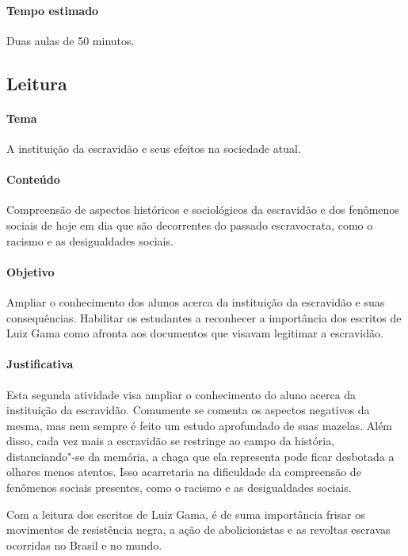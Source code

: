 \documentclass[12pt]{extarticle}
\begin{document}
\paragraph{Tempo estimado} Duas aulas de 50 minutos.

\subsection{Leitura}


\paragraph{Tema} A instituição da escravidão e seus efeitos na sociedade atual.

\paragraph{Conteúdo} Compreensão de aspectos históricos e sociológicos
da escravidão e dos fenômenos sociais de hoje em dia que são decorrentes
do passado escravocrata, como o racismo e as desigualdades sociais.

\paragraph{Objetivo} Ampliar o conhecimento dos alunos acerca da instituição da 
escravidão e suas consequências. Habilitar os estudantes a reconhecer a importância 
dos escritos de Luiz Gama como afronta aos documentos que visavam legitimar a escravidão.

\paragraph{Justificativa} Esta segunda atividade visa ampliar o conhecimento do aluno
acerca da instituição da escravidão. Comumente se comenta os aspectos
negativos da mesma, mas nem sempre é feito um estudo aprofundado de suas
mazelas. Além disso, cada vez mais a escravidão se restringe ao campo da
história, distanciando"-se da memória, a chaga que ela representa pode
ficar desbotada a olhares menos atentos. Isso acarretaria na dificuldade
da compreensão de fenômenos sociais presentes, como o racismo e as
desigualdades sociais.

Com a leitura dos escritos de Luiz Gama, é de suma importância
frisar os movimentos de resistência negra, a ação de abolicionistas
e as revoltas escravas ocorridas no Brasil e no
mundo.
\end{document}
